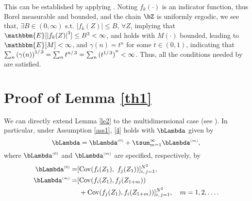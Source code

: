 \documentclass[10pt, twocolumn]{IEEEtran}
\begin{document}
This can be established by applying \cite[Corollary
1]{jones2004markov}. Noting $f_k(\cdot)$ is an indicator function, thus
Borel measurable and bounded, and the chain $\bZ$ is uniformly ergodic,
we see that, $\exists B \in ( {0,\infty })$ s.t. $|
  {{f_k}( Z )} | \leq B, \, \forall Z$, implying that
$\mathbbm{E}[ {{{| {{f_k}( Z)}|}^3}} ] \leq {B^3} < \infty $, and
\cite[(3)]{jones2004markov} holds 
with $M(\cdot)$ bounded, leading to $\mathbbm{E}[ M ] <
\infty $, and $\gamma(n) = t^n$ for some $t \in (0, 1)$, indicating that
$\sum\nolimits_n {{{( {\gamma ( n )} )}^{{1
        \mathord{/ {\vphantom {1 3}} .
          \kern-\nulldelimiterspace} 3}}}} = \sum\nolimits_n {{t^{{n
        \mathord{/ {\vphantom {n 3}} .
          \kern-\nulldelimiterspace} 3}}}} = \sum\nolimits_n {{{(
        {{t^{{1 \mathord{/ {\vphantom {1 3}} .
                  \kern-\nulldelimiterspace} 3}}}} )}^n}} < \infty
$. Thus, all the conditions needed by \cite[Corollary
1]{jones2004markov} are satisfied.


\section{Proof of Lemma \ref{th1}}  \label{sec:thm1}

We can directly extend Lemma \ref{le2} to the multidimensional case (see
\cite[Chap. 8]{GeyerCourseNotes}). In particular, under
Assumption \ref{ass1}, \eqref{4} holds with $\bLambda$ given by
\begin{equation} 
\bLambda =  {\bLambda ^{\scriptscriptstyle{(0)}}} + \tsum_{m =
  1}^\infty  {{\bLambda ^{\scriptscriptstyle{(m)}}}}, 
\label{40}
\end{equation}
where ${\bLambda ^{\scriptscriptstyle{(0)}}}$ and ${\bLambda
  ^{\scriptscriptstyle{(m)}}}$ are specified, respectively,
by 
\begin{align*}
{\bLambda ^{\scriptscriptstyle{(0)}}} = & [ {\operatorname{Cov} (
  {{f_i}( {{Z_1}} ),~{f_j}( {{Z_1}} )} )} ]_{i,\,j = 1}^{{N^2}},\\
{\bLambda ^{\scriptscriptstyle{(m)}}} = &  [{\mathop{\rm Cov}\nolimits} ( {{f_i}( {{Z_1}} ),{f_j}( {{Z_{1 + m}}} )} ) \notag\\
 & \phantom{[ } 
+ {\mathop{\rm Cov}\nolimits} ( {{f_j}( {{Z_1}} ),{f_i}( {{Z_{1 + m}}}
  )} )]_{i,\,j = 1}^{{N^2}},
 \quad m = 1,2, \ldots . \notag
\end{align*}
\end{document}
